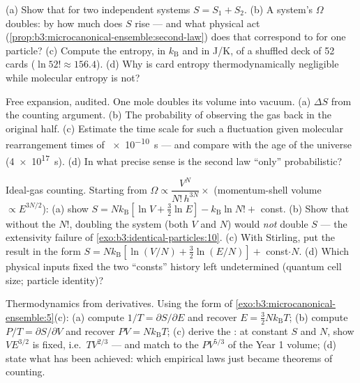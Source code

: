 \begin{exercise}[$\star$]\label{exo:b3:microcanonical-ensemble:3}
(a) Show that for two independent systems $S = S_1 + S_2$. (b) A
system's $\Omega$ doubles: by how much does $S$ rise --- and what
physical act (\cref{prop:b3:microcanonical-ensemble:second-law})
does that correspond to for one particle? (c) Compute the entropy,
in $k_{\text{B}}$ and in J/K, of a shuffled deck of 52 cards
($\ln52! \approx 156.4$). (d) Why is card entropy thermodynamically
negligible while molecular entropy is not?
\end{exercise}

\begin{exercise}[$\star$]\label{exo:b3:microcanonical-ensemble:4}
Free expansion, audited. One mole doubles its volume into vacuum.
(a) $\Delta S$ from the counting argument. (b) The probability of
observing the gas back in the original half. (c) Estimate the time
scale for such a fluctuation given molecular rearrangement times of
\qty{e-10}{s} --- and compare with the age of the universe
(\qty{4e17}{s}). (d) In what precise sense is the second law
``only'' probabilistic?
\end{exercise}

\begin{exercise}[$\star\star$]\label{exo:b3:microcanonical-ensemble:5}
Ideal-gas counting. Starting from
$\Omega \propto \dfrac{V^N}{N!\,h^{3N}}\times$ (momentum-shell
volume $\propto E^{3N/2}$): (a) show $S = Nk_{\text{B}}[\ln V +
\tfrac32\ln E] - k_{\text{B}}\ln N! + $ const. (b) Show that
without the $N!$, doubling the system (both $V$ and $N$) would
\emph{not} double $S$ --- the extensivity failure of
\cref{exo:b3:identical-particles:10}. (c) With Stirling, put the
result in the form $S = Nk_{\text{B}}[\ln(V/N) + \tfrac32\ln(E/N)]
+ $ const$\cdot N$. (d) Which physical inputs fixed the two
``consts'' history left undetermined (quantum cell size; particle
identity)?
\end{exercise}

\begin{exercise}[$\star\star$]\label{exo:b3:microcanonical-ensemble:6}
Thermodynamics from derivatives. Using the form of
\cref{exo:b3:microcanonical-ensemble:5}(c): (a) compute $1/T =
\partial S/\partial E$ and recover $E = \tfrac32 Nk_{\text{B}}T$;
(b) compute $P/T = \partial S/\partial V$ and recover $PV =
Nk_{\text{B}}T$; (c) derive the : at constant
$S$ and $N$, show $VE^{3/2}$ is fixed, i.e.\ $TV^{2/3}$ --- and
match to the $PV^{5/3}$ of the Year 1 volume; (d) state what has
been achieved: which empirical laws just became theorems of
counting.
\end{exercise}

